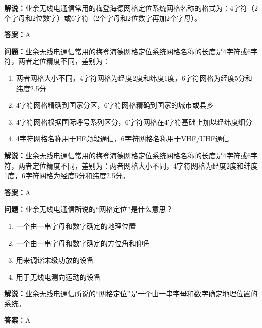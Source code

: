 \textbf{解说：}业余无线电通信常用的梅登海德网格定位系统网格名称的格式为：4字符（2个字母和2位数字）或6字符（2个字母和2位数字再加2个字母）。

\textbf{答案：}A

\textbf{问题：}业余无线电通信常用的梅登海德网格定位系统网格名称的长度是4字符或6字符，两者定位精度不同，差别为：

\begin{enumerate}[label=\Alph*), leftmargin=3em]
	\item 两者网格大小不同，4字符网格为经度2度和纬度1度，6字符网格为经度5分和纬度2.5分
	\item 4字符网格精确到国家分区，6字符网格精确到国家的城市或县乡
	\item 4字符网格根据国际呼号系列区分，6字符网格在4字符基础上加以经纬度细分
	\item 4字符网格名称用于HF频段通信，6字符网格名称用于VHF/UHF通信
\end{enumerate}

\textbf{解说：}业余无线电通信常用的梅登海德网格定位系统网格名称的长度是4字符或6字符，两者定位精度不同，差别为：两者网格大小不同，4字符网格为经度2度和纬度1度，6字符网格为经度5分和纬度2.5分。

\textbf{答案：}A

\textbf{问题：}业余无线电通信所说的“网格定位”是什么意思？

\begin{enumerate}[label=\Alph*), leftmargin=3em]
	\item 一个由一串字母和数字确定的地理位置
	\item 一个由一串字母和数字确定的方位角和仰角
	\item 用来调谐末级功放的设备
	\item 用于无线电测向运动的设备
\end{enumerate}

\textbf{解说：}业余无线电通信所说的“网格定位”是一个由一串字母和数字确定地理位置的系统。

\textbf{答案：}A